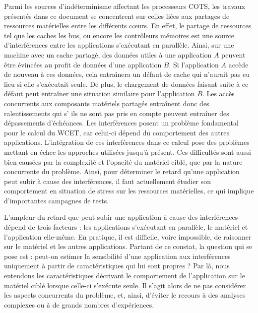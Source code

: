 Parmi les sources d'indéterminisme affectant les processeurs COTS, les travaux présentés dans ce document se concentrent sur celles liées aux partages de ressources matérielles entre les différents cœurs.
En effet, le partage de ressources tel que les caches les bus, ou encore les contrôleurs mémoires est une source d'interférences entre les applications s'exécutant en parallèle.
Ainsi, sur une machine avec un cache partagé, des données utiles à une application $A$ peuvent être évincées au profit de données d'une application $B$.
Si l'application $A$ accède de nouveau à ces données, cela entraînera un défaut de cache qui n'aurait pas eu lieu si elle s'exécutait seule.
De plus, le chargement de données faisant suite à ce défaut peut entraîner une situation similaire pour l'application $B$.
Les accès concurrents aux composants matériels partagés entraînent donc des ralentissements qui s’ ils ne sont pas pris en compte peuvent entraîner des dépassements d'échéances.
Les interférences posent un problème fondamental pour le calcul du WCET, car celui-ci dépend du comportement des autres applications.
L'intégration de ces interférences dans ce calcul pose des problèmes mettant en échec les approches utilisées jusqu'à présent.
Ces difficultés sont aussi bien causées par la complexité et l'opacité du matériel ciblé, que par la nature concurrente du problème.
Ainsi, pour déterminer le retard qu'une application peut subir à cause des interférences, il faut actuellement étudier son comportement en situation de stress sur les ressources matérielles, ce qui implique d'importantes campagnes de tests.

L'ampleur du retard que peut subir une application à cause des interférences dépend de trois facteurs : les applications s'exécutant en parallèle, le matériel et l'application elle-même.
En pratique, il est difficile, voire impossible, de raisonner sur le matériel et les autres applications.
Partant de ce constat, la question qui se pose est : peut-on estimer la sensibilité d'une application aux interférences uniquement à partir de caractéristiques qui lui sont propres ?
Par là, nous entendons les caractéristiques  décrivant le comportement de l'application sur le matériel ciblé lorsque celle-ci s'exécute seule.
Il s'agit alors de ne pas considérer les aspects concurrents du problème, et, ainsi, d'éviter le recours à des analyses complexes ou à de grands nombres d'expériences.

